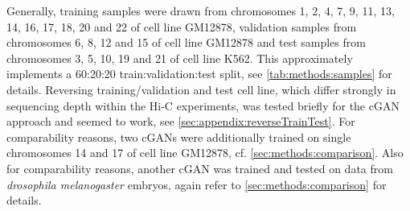 Generally, training samples were drawn from chromosomes 1, 2, 4, 7, 9, 11, 13, 14, 16, 17, 18, 20 and 22 of cell line GM12878, 
validation samples from chromosomes 6, 8, 12 and 15 of cell line GM12878 and test samples from chromosomes 3, 5, 10, 19 and 21 of cell line K562.
This approximately implements a 60:20:20 train:validation:test split, see \cref{tab:methods:samples} for details.
Reversing training/validation and test cell line, which differ strongly in sequencing depth within the Hi-C experiments, 
was tested briefly for the cGAN approach and seemed to work, see \cref{sec:appendix:reverseTrainTest}.
For comparability reasons, two cGANs were additionally trained on single chromosomes 14 and 17 of cell line GM12878,  cf. \cref{sec:methods:comparison}.
Also for comparability reasons, another cGAN was trained and tested on data from \emph{drosophila melanogaster} embryos, again refer to \cref{sec:methods:comparison}
for details.

